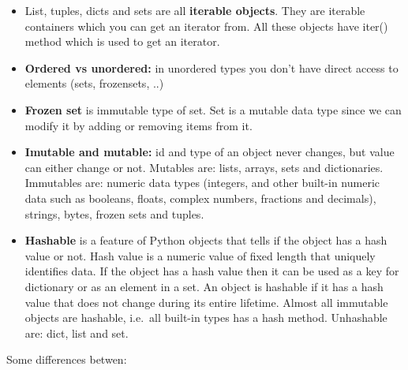 \documentclass[
  letterpaper,
  DIV=11,
  numbers=noendperiod]{scrreprt}
\begin{document}
\begin{itemize}
\item
  List, tuples, dicts and sets are all \textbf{iterable objects}. They
  are iterable containers which you can get an iterator from. All these
  objects have iter() method which is used to get an iterator.
\item
  \textbf{Ordered vs unordered:} in unordered types you don't have
  direct access to elements (sets, frozensets, ..)
\item
  \textbf{Frozen set} is immutable type of set. Set is a mutable data
  type since we can modify it by adding or removing items from it.
\item
  \textbf{Imutable and mutable:} id and type of an object never changes,
  but value can either change or not. Mutables are: lists, arrays, sets
  and dictionaries. Immutables are: numeric data types (integers, and
  other built-in numeric data such as booleans, floats, complex numbers,
  fractions and decimals), strings, bytes, frozen sets and tuples.
\item
  \textbf{Hashable} is a feature of Python objects that tells if the
  object has a hash value or not. Hash value is a numeric value of fixed
  length that uniquely identifies data. If the object has a hash value
  then it can be used as a key for dictionary or as an element in a set.
  An object is hashable if it has a hash value that does not change
  during its entire lifetime. Almost all immutable objects are hashable,
  i.e.~all built-in types has a hash method. Unhashable are: dict, list
  and set.
\end{itemize}

Some differences betwen:
\end{document}
